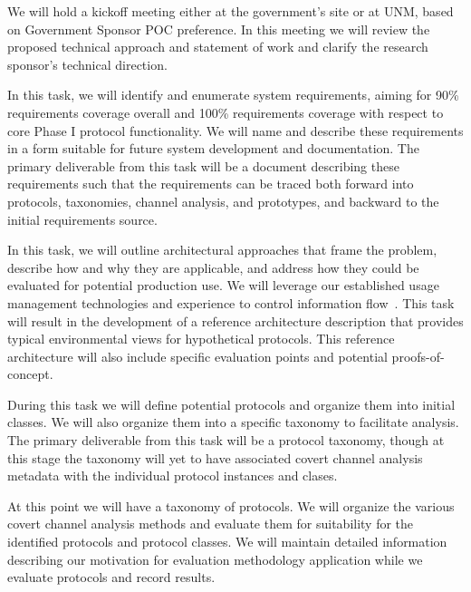 \documentclass{sbir}
\begin{document}
We will hold a kickoff meeting either at the government's site or at UNM, based on Government Sponsor POC preference. In this meeting we will review the proposed technical approach and statement of work and clarify the research sponsor's technical direction.

In this task, we will identify and enumerate system requirements, aiming for 90\% requirements coverage overall and 100\% requirements coverage with respect to core Phase I protocol functionality. We will name and describe these requirements in a form suitable for future system development and documentation. The primary deliverable from this task will be a document describing these requirements such that the requirements can be traced both forward into protocols, taxonomies, channel analysis, and prototypes, and backward to the initial requirements source. 

In this task, we will outline architectural approaches that frame the problem, describe how and why they are applicable, and address how they could be evaluated for potential production use. We will leverage our established usage management technologies and experience to control information flow~\cite{JaLaHe:11,JaLaHe:12}. This task will result in the development of a reference architecture description that provides typical environmental views for hypothetical protocols. This reference architecture will also include specific evaluation points and potential proofs-of-concept.

During this task we will define potential protocols and organize them into initial classes. We will also organize them into a specific taxonomy to facilitate analysis. The primary deliverable from this task will be a protocol taxonomy, though at this stage the taxonomy will yet to have associated covert channel analysis metadata with the individual protocol instances and clases.

At this point we will have a taxonomy of protocols. We will organize the various covert channel analysis methods and evaluate them for suitability for the identified protocols and protocol classes. We will maintain detailed information describing our motivation for evaluation methodology application while we evaluate protocols and record results.
\end{document}
